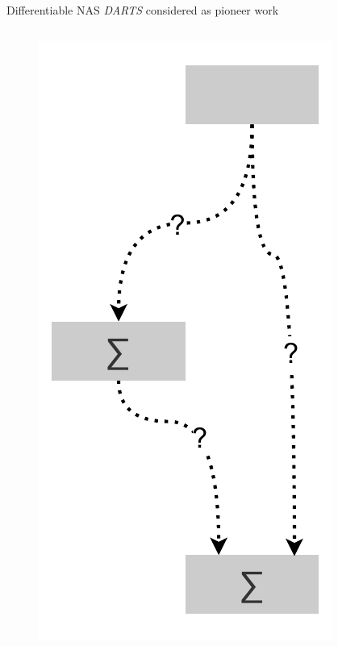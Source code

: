 \documentclass[]{beamer}
\begin{document}
\begin{frame}{Differentiable NAS}
\vspace{10pt}
\textit{DARTS} \cite{Liu2018} considered as pioneer work
\vfill
\begin{columns}
\begin{column}{.35\textwidth}
\begin{figure}
	\includegraphics[scale=0.4, center]{graphics/darts_0.pdf}
\end{figure}
\end{column}
\begin{column}{.3\textwidth}
\end{column}
\begin{column}{.35\textwidth}
\end{column}
\end{columns}
\end{frame}
\end{document}

